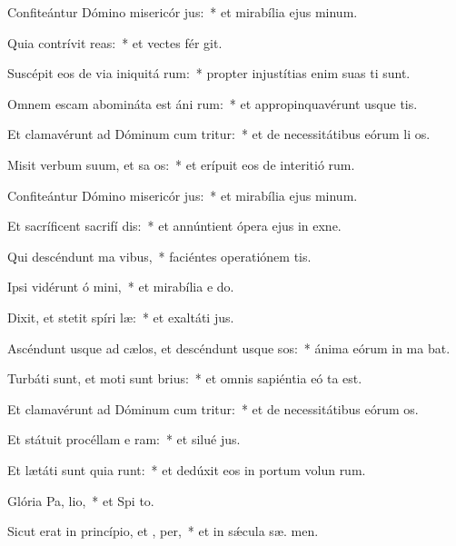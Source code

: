 \item Confiteántur Dómino misericór jus:~* et mirabília ejus  minum.
\item Quia contrívit  reas:~* et vectes fér git.
\item Suscépit eos de via iniquitá rum:~* propter injustítias enim suas ti sunt.
\item Omnem escam abomináta est áni rum:~* et appropinquavérunt usque   tis.
\item Et clamavérunt ad Dóminum cum tritur:~* et de necessitátibus eórum li os.
\item Misit verbum suum, et sa os:~* et erípuit eos de interitió rum.
\item Confiteántur Dómino misericór jus:~* et mirabília ejus  minum.
\item Et sacríficent sacrifí dis:~* et annúntient ópera ejus in exne.
\item Qui descéndunt ma  vibus,~* faciéntes operatiónem   tis.
\item Ipsi vidérunt ó mini,~* et mirabília e  do.
\item Dixit, et stetit spíri læ:~* et exaltáti   jus.
\item Ascéndunt usque ad cælos, et descéndunt usque  sos:~* ánima eórum in ma bat.
\item Turbáti sunt, et moti sunt  brius:~* et omnis sapiéntia eó ta est.
\item Et clamavérunt ad Dóminum cum tritur:~* et de necessitátibus eórum  os.
\item Et státuit procéllam e  ram:~* et silué  jus.
\item Et lætáti sunt quia runt:~* et dedúxit eos in portum volun rum.
\item Glória Pa,  lio,~* et Spi to.
\item Sicut erat in princípio, et ,  per,~* et in sǽcula sæ. men.
